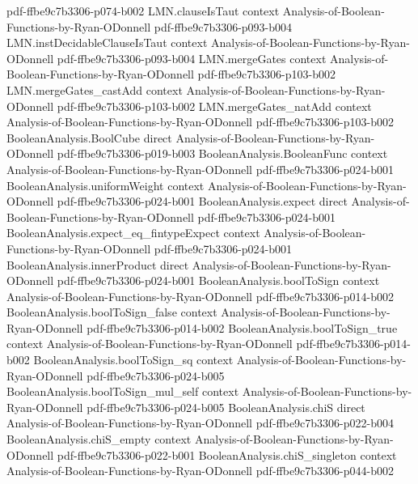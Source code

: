 \begin{lemma}
  {pdf-ffbe9c7b3306-p074-b002}
\proofstep
  {LMN.clauseIsTaut}
  {context}
  {Analysis-of-Boolean-Functions-by-Ryan-ODonnell}
  {pdf-ffbe9c7b3306-p093-b004}
\proofstep
  {LMN.instDecidableClauseIsTaut}
  {context}
  {Analysis-of-Boolean-Functions-by-Ryan-ODonnell}
  {pdf-ffbe9c7b3306-p093-b004}
\proofstep
  {LMN.mergeGates}
  {context}
  {Analysis-of-Boolean-Functions-by-Ryan-ODonnell}
  {pdf-ffbe9c7b3306-p103-b002}
\proofstep
  {LMN.mergeGates_castAdd}
  {context}
  {Analysis-of-Boolean-Functions-by-Ryan-ODonnell}
  {pdf-ffbe9c7b3306-p103-b002}
\proofstep
  {LMN.mergeGates_natAdd}
  {context}
  {Analysis-of-Boolean-Functions-by-Ryan-ODonnell}
  {pdf-ffbe9c7b3306-p103-b002}
\proofstep
  {BooleanAnalysis.BoolCube}
  {direct}
  {Analysis-of-Boolean-Functions-by-Ryan-ODonnell}
  {pdf-ffbe9c7b3306-p019-b003}
\proofstep
  {BooleanAnalysis.BooleanFunc}
  {context}
  {Analysis-of-Boolean-Functions-by-Ryan-ODonnell}
  {pdf-ffbe9c7b3306-p024-b001}
\proofstep
  {BooleanAnalysis.uniformWeight}
  {context}
  {Analysis-of-Boolean-Functions-by-Ryan-ODonnell}
  {pdf-ffbe9c7b3306-p024-b001}
\proofstep
  {BooleanAnalysis.expect}
  {direct}
  {Analysis-of-Boolean-Functions-by-Ryan-ODonnell}
  {pdf-ffbe9c7b3306-p024-b001}
\proofstep
  {BooleanAnalysis.expect_eq_fintypeExpect}
  {context}
  {Analysis-of-Boolean-Functions-by-Ryan-ODonnell}
  {pdf-ffbe9c7b3306-p024-b001}
\proofstep
  {BooleanAnalysis.innerProduct}
  {direct}
  {Analysis-of-Boolean-Functions-by-Ryan-ODonnell}
  {pdf-ffbe9c7b3306-p024-b001}
\proofstep
  {BooleanAnalysis.boolToSign}
  {context}
  {Analysis-of-Boolean-Functions-by-Ryan-ODonnell}
  {pdf-ffbe9c7b3306-p014-b002}
\proofstep
  {BooleanAnalysis.boolToSign_false}
  {context}
  {Analysis-of-Boolean-Functions-by-Ryan-ODonnell}
  {pdf-ffbe9c7b3306-p014-b002}
\proofstep
  {BooleanAnalysis.boolToSign_true}
  {context}
  {Analysis-of-Boolean-Functions-by-Ryan-ODonnell}
  {pdf-ffbe9c7b3306-p014-b002}
\proofstep
  {BooleanAnalysis.boolToSign_sq}
  {context}
  {Analysis-of-Boolean-Functions-by-Ryan-ODonnell}
  {pdf-ffbe9c7b3306-p024-b005}
\proofstep
  {BooleanAnalysis.boolToSign_mul_self}
  {context}
  {Analysis-of-Boolean-Functions-by-Ryan-ODonnell}
  {pdf-ffbe9c7b3306-p024-b005}
\proofstep
  {BooleanAnalysis.chiS}
  {direct}
  {Analysis-of-Boolean-Functions-by-Ryan-ODonnell}
  {pdf-ffbe9c7b3306-p022-b004}
\proofstep
  {BooleanAnalysis.chiS_empty}
  {context}
  {Analysis-of-Boolean-Functions-by-Ryan-ODonnell}
  {pdf-ffbe9c7b3306-p022-b001}
\proofstep
  {BooleanAnalysis.chiS_singleton}
  {context}
  {Analysis-of-Boolean-Functions-by-Ryan-ODonnell}
  {pdf-ffbe9c7b3306-p044-b002}

\end{lemma}
